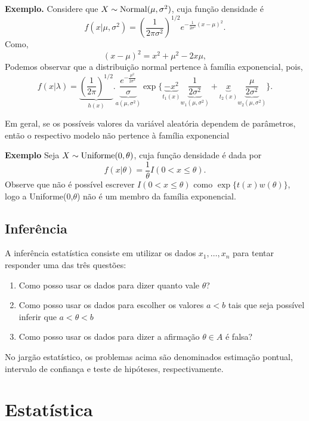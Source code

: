 \documentclass[
  letterpaper,
  DIV=11,
  numbers=noendperiod]{scrartcl}
\providecommand{\tightlist}{%
  \setlength{\itemsep}{0pt}\setlength{\parskip}{0pt}}\usepackage{longtable,booktabs,array}
\begin{document}
\textbf{Exemplo.} Considere que \(X\sim\hbox{Normal}(\mu,\sigma^2)\),
cuja função densidade é
\[f(x|\mu,\sigma^2)=\left(\frac{1}{2\pi\sigma^2}\right)^{1/2} e^{-\frac{1}{2\sigma^2}(x-\mu)^2}.\]
Como, \[(x-\mu)^2=x^2+\mu^2-2x\mu,\] Podemos observar que a distribuição
normal pertence à família exponencial, pois,
\[f(x|\lambda)=\underbrace{\left(\frac{1}{2\pi}\right)^{1/2}}_{h(x)}.\underbrace{\frac{e^{-\frac{\mu^2}{2\sigma^2}}}{\sigma}}_{a(\mu,\sigma^2)}\exp\{\underbrace{-x^2}_{t_1(x)}\underbrace{\frac{1}{2\sigma^2}}_{w_1(\mu,\sigma^2)}+\underbrace{x}_{t_2(x)}\underbrace{\frac{\mu}{2\sigma^2}}_{w_2(\mu,\sigma^2)}\}.\]

Em geral, se os possíveis valores da variável aleatória dependem de
parâmetros, então o respectivo modelo não pertence à família exponencial

\textbf{Exemplo} Seja \(X\sim\hbox{Uniforme}(0,\theta)\), cuja função
densidade é dada por \[f(x|\theta)=\frac{1}{\theta}I(0< x\leq \theta).\]
Observe que não é possível escrever \(I(0<x\leq \theta)\) como
\(\exp\{t(x)w(\theta)\}\), logo a Uniforme(0,\(\theta\)) não é um membro
da família exponencial.

\section{Inferência}\label{inferuxeancia}

A inferência estatística consiste em utilizar os dados
\(x_1,\ldots,x_n\) para tentar responder uma das três questões:

\begin{enumerate}
\def\labelenumi{\arabic{enumi}.}
\tightlist
\item
  Como posso usar os dados para dizer quanto vale \(\theta\)?
\item
  Como posso usar os dados para escolher os valores \(a<b\) tais que
  seja possível inferir que \(a<\theta<b\)
\item
  Como posso usar os dados para dizer a afirmação \(\theta\in A\) é
  falsa?
\end{enumerate}

No jargão estatístico, os problemas acima são denominados estimação
pontual, intervalo de confiança e teste de hipóteses, respectivamente.


\chapter{Estatística}\label{estatuxedstica}
\end{document}

